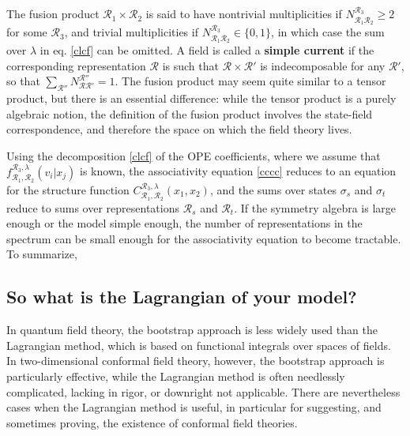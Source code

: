 \documentclass[12pt, a4paper, notitlepage, twoside]{report}
\numberwithin{equation}{section}
\theoremstyle{break}
\begin{document}
The fusion product $\mathcal{R}_1\times \mathcal{R}_2$ is said to have nontrivial multiplicities if $N_{\mathcal{R}_1\mathcal{R}_2}^{\mathcal{R}_3}\geq 2$ for some $\mathcal{R}_3$, and trivial multiplicities if $N_{\mathcal{R}_1\mathcal{R}_2}^{\mathcal{R}_3}\in \{0,1\}$, in which case the sum over $\lambda$ in eq. \eqref{clcf} can be omitted.
A field is called a \textbf{\boldmath simple current} if the corresponding representation $\mathcal{R}$ is such that $\mathcal{R}\times \mathcal{R}'$ is indecomposable for any $\mathcal{R}'$, so that $\sum_{\mathcal{R}''} N_{\mathcal{R}\mathcal{R}'}^{\mathcal{R}''} =1$. 
The fusion product may seem quite similar to a tensor product, but there is an essential difference: while the tensor product is a purely algebraic notion, the definition of the fusion product involves the state-field correspondence, and therefore the space on which the field theory lives. 

Using the decomposition \eqref{clcf} of the OPE coefficients, where we assume that $f_{\mathcal{R}_1,\mathcal{R}_2}^{\mathcal{R}_3,\lambda}(v_i|x_j)$ is known, the 
associativity equation \eqref{cccc} reduces to an equation for the structure function $C_{\mathcal{R}_1,\mathcal{R}_2}^{\mathcal{R}_3,\lambda}(x_1,x_2)$, and the sums over states $\sigma_s$ and $\sigma_t$ reduce to sums over representations $\mathcal{R}_s$ and $\mathcal{R}_t$.
If the symmetry algebra is large enough or the model simple enough, the number of representations in the spectrum can be small enough for the associativity equation to become tractable.
To summarize,
\begin{center}
\end{center}


\subsection{So what is the Lagrangian of your model? \label{seclagr}}

In quantum field theory, the bootstrap approach is less widely used than the Lagrangian method, which is based on functional integrals over spaces of fields.
In two-dimensional conformal field theory, however, the bootstrap approach is particularly effective, while the Lagrangian method is often needlessly complicated, lacking in rigor, or downright not applicable. 
There are nevertheless cases when the Lagrangian method is useful, in particular for 
suggesting, and sometimes proving, the existence of conformal field theories. 
\end{document}
